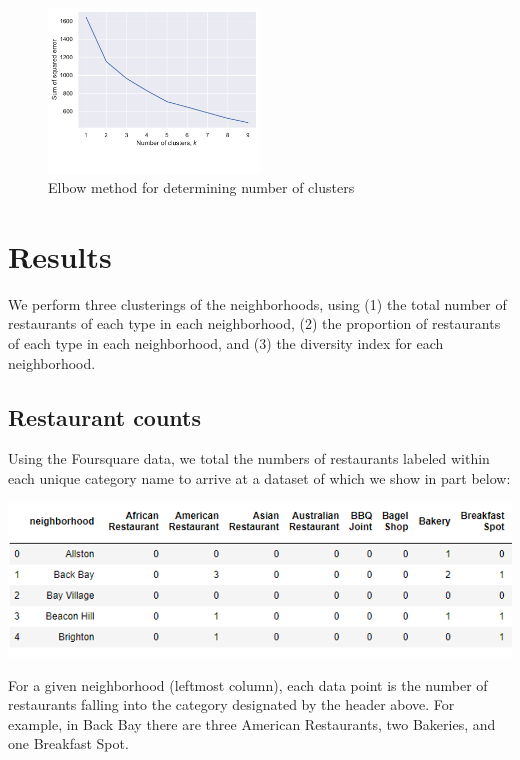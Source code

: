\documentclass[11pt, a4paper]{article} %
\begin{document}
\begin{figure}
\begin{center}
\includegraphics[width=0.5\textwidth]{elbow.pdf}
\end{center}
\caption{Elbow method for determining number of clusters}
\end{figure}


\section{Results}

We perform three clusterings of the neighborhoods, using (1) the total number of restaurants of each type in each neighborhood, (2) the proportion of restaurants of each type in each neighborhood, and (3) the diversity index for each neighborhood.

\subsection{Restaurant counts}
Using the Foursquare data, we total the numbers of restaurants labeled within each unique category name to arrive at a dataset of which we show in part below:
\begin{center}
\includegraphics[]{df_counts.png}
\end{center}
For a given neighborhood (leftmost column), each data point is the number of restaurants falling into the category designated by the header above.
For example, in Back Bay there are three American Restaurants, two Bakeries, and one Breakfast Spot.
\end{document}
